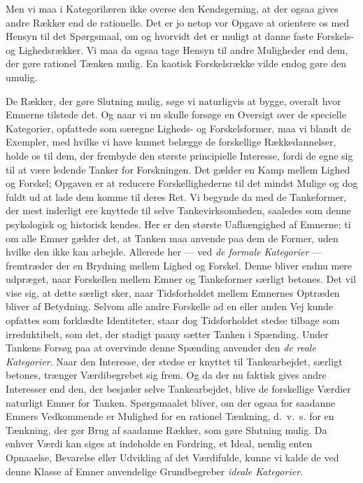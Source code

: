 \documentclass[12pt,a4paper]{book}
\newcommand{\opage}[1]{\marginnote{\footnotesize\textit{[#1]}}}
\newcommand{\apage}[1]{\marginnote{\footnotesize\textit{[#1]}}}
\begin{document}
Men vi maa i Kategorilæren ikke overse den Kendsgerning, at der ogsaa
gives andre Rækker end de rationelle. Det er jo netop vor Opgave at
orientere os med Hensyn til det Spørgsmaal, om og hvorvidt det er
muligt at danne faste Forskels- og Lighedsrækker. Vi maa da ogsaa tage
Hensyn til andre Muligheder end dem, der gøre rationel Tænken \apage{174} mulig. En
kaotisk Forskelsrække vilde endog gøre den umulig.

De Rækker, der gøre Slutning mulig, søge vi naturligvis at bygge,
overalt hvor Emnerne tilstede det. Og naar vi nu skulle forsøge en
Oversigt over de specielle Kategorier, opfattede som særegne Ligheds-
og Forskelsformer, maa vi blandt de Exempler, med hvilke vi have kunnet
belægge de forskellige Rækkedannelser, holde os til dem, der frembyde
den største principielle Interesse, fordi de egne sig til at være
ledende Tanker for Forskningen. Det gælder en Kamp mellem Lighed og
Forskel; Opgaven er at reducere Forskellighederne til det mindst Mulige
og dog fuldt ud at lade dem komme til deres Ret. Vi begynde da med de
Tankeformer, der mest inderligt ere knyttede til selve
Tankevirksomheden, saaledes som denne psykologisk og historisk kendes.
Her er den største Uafhængighed af Emnerne; ti om alle Emner gælder
det, at Tanken maa anvende paa dem de Former, uden hvilke den ikke kan
arbejde. Allerede her --- ved \emph{de formale Kategorier} ---
fremtræder der en Brydning mellem Lighed og Forskel. Denne bliver endnu
mere udpræget, naar Forskellen mellem Emner og Tankeformer særligt
betones. Det vil vise sig, at dette særligt sker, naar Tidsforholdet
mellem Emnernes Optræden bliver af Betydning. Selvom alle andre
Forskelle ad en eller anden Vej kunde opfattes som forklædte
Identiteter, staar dog Tidsforholdet stedse tilbage som irreduktibelt,
som det, der stadigt paany sætter Tanken i Spænding. Under Tankens
Forsøg paa at overvinde denne Spænding anvender den \emph{de reale
Kategorier}. Naar den Interesse, der stedse er knyttet til
Tankearbejdet, særligt betones, trænger Værdibegrebet sig frem. Og da
der nu faktisk gives andre Interesser end den, der besjæler selve
Tankearbejdet, blive de forskellige Værdier naturligt Emner for Tanken.
Spørgsmaalet bliver, om der ogsaa for saadanne Emners Vedkommende er
Mulighed for en rationel Tænkning, d.\ v.\ s. for en Tænkning, der gør
Brug af saadanne Rækker, som gøre Slutning mulig. Da enhver Værdi kan
siges at indeholde en Fordring, et \opage{175} Ideal, nemlig enten Opnaaelse,
Bevarelse eller Udvikling af det Værdifulde, kunne vi kalde de ved
denne Klasse af Emner anvendelige Grundbegreber \emph{ideale
Kategorier}.
\end{document}
